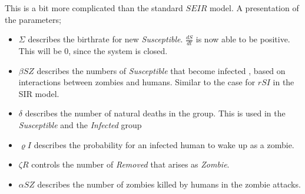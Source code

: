 \documentclass[%
twoside,                 %
final,                   %
chapterprefix=true,      %
open=right               %
10pt]{book}
\begin{document}
This is a bit more complicated than the standard $SEIR$ model. A presentation of the parameters;
\begin{itemize}
\item $\Sigma$ describes the birthrate for new \emph{Susceptible}. $\frac{dS}{dt}$ is now able to be positive. This will be 0, since the system is closed. 

\item $\beta SZ$ describes the numbers of \emph{Susceptible} that become infected , based on interactions between zombies and humans. Similar to the case for $rSI$ in the SIR model. 

\item $\delta$ describes the number of natural deaths in the group. This is used in the \emph{Susceptible} and the \emph{Infected} group

\item $\varrho I$ describes the probability for an infected human to wake up as a zombie.

\item $\zeta R$ controls the number of \emph{Removed} that arises as \emph{Zombie}. 

\item $\alpha SZ$ describes the number of zombies killed by humans in the zombie attacks. 
\end{itemize}

\noindent


\vspace{3mm}




\vspace{3mm}
\end{document}

